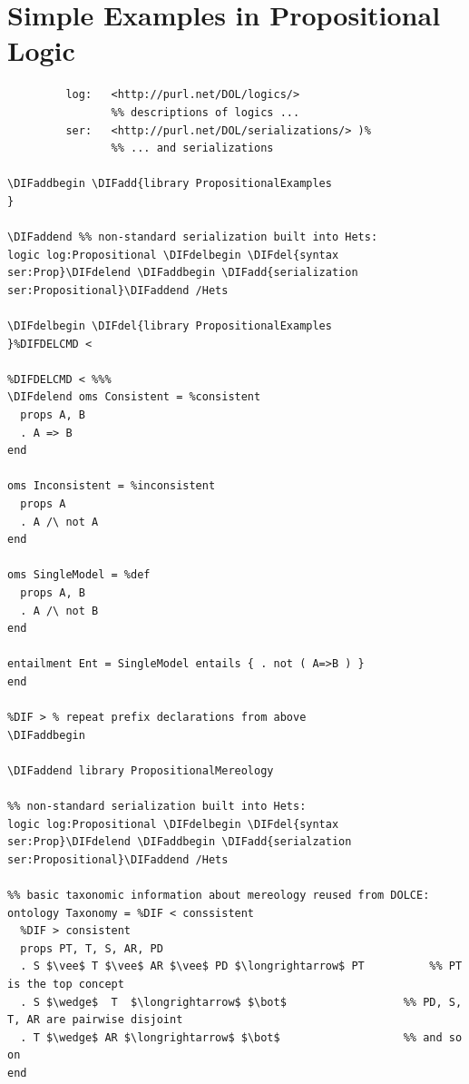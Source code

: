 \documentclass[10pt,fleqn,final]{scrreprt}
\newcommand{\sclause}[1]{\section{#1}}
\providecommand{\DIFadd}[1]{{\protect\color{blue}\uwave{#1}}} %
\providecommand{\DIFdel}[1]{{\protect\color{red}\sout{#1}}}                      %
\providecommand{\DIFaddbegin}{} %
\providecommand{\DIFaddend}{} %
\providecommand{\DIFdelbegin}{} %
\providecommand{\DIFdelend}{} %
\begin{document}
\sclause{Simple Examples in Propositional Logic}\DIFdelbegin %
\DIFdelend \DIFaddbegin \label{ex:prop}
\begin{lstlisting}[basicstyle=\ttfamily,language=dolText,alsolanguage=prop,escapechar=@,mathescape]
\DIFaddend %prefix( :      <http://www.example.org/prop#>
         log:   <http://purl.net/DOL/logics/>
                %% descriptions of logics ...
         ser:   <http://purl.net/DOL/serializations/> )%
                %% ... and serializations

\DIFaddbegin \DIFadd{library PropositionalExamples
}

\DIFaddend %% non-standard serialization built into Hets: 
logic log:Propositional \DIFdelbegin \DIFdel{syntax ser:Prop}\DIFdelend \DIFaddbegin \DIFadd{serialization ser:Propositional}\DIFaddend /Hets       

\DIFdelbegin \DIFdel{library PropositionalExamples
}%DIFDELCMD < 

%DIFDELCMD < %%%
\DIFdelend oms Consistent = %consistent
  props A, B
  . A => B
end

oms Inconsistent = %inconsistent
  props A
  . A /\ not A
end

oms SingleModel = %def
  props A, B
  . A /\ not B
end

entailment Ent = SingleModel entails { . not ( A=>B ) }
end

%DIF > % repeat prefix declarations from above
\DIFaddbegin 

\DIFaddend library PropositionalMereology

%% non-standard serialization built into Hets: 
logic log:Propositional \DIFdelbegin \DIFdel{syntax ser:Prop}\DIFdelend \DIFaddbegin \DIFadd{serialzation ser:Propositional}\DIFaddend /Hets

%% basic taxonomic information about mereology reused from DOLCE:
ontology Taxonomy = %DIF < conssistent      
  %DIF > consistent
  props PT, T, S, AR, PD
  . S $\vee$ T $\vee$ AR $\vee$ PD $\longrightarrow$ PT          %% PT is the top concept
  . S $\wedge$  T  $\longrightarrow$ $\bot$                  %% PD, S, T, AR are pairwise disjoint
  . T $\wedge$ AR $\longrightarrow$ $\bot$                   %% and so on
end
\end{lstlisting}
\end{document}
